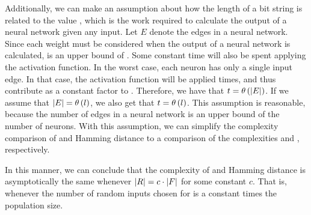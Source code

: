 Additionally, we can make an assumption about how the length of a bit string \bitstringl{} is related to the value \timet, which is the work required to calculate the output of a neural network given any input. Let $E$ denote the edges in a neural network. Since each weight must be considered when the output of a neural network is calculated,  is an upper bound of \timet. Some constant time will also be spent applying the activation function. In the worst case, each neuron has only a single input edge. In that case, the activation function will be applied  times, and thus contribute as a constant factor to \timet. Therefore, we have that $t = \theta\left(\lvert E\rvert\right)$. If we assume that $\lvert E\rvert = \theta\left(l\right)$, we also get that $t = \theta\left(l\right)$. This assumption is reasonable, because the number of edges in a neural network is an upper bound of the number of neurons. With this assumption, we can simplify the complexity comparison of \dia{} and Hamming distance to a comparison of the complexities \bigO{\ransetl} and \bigO{\indsetl}, respectively.

In this manner, we can conclude that the complexity of \dia{} and Hamming distance is asymptotically the same whenever $\lvert R\rvert = c \cdot \lvert F\rvert$ for some constant $c$. That is, whenever the number of random inputs chosen for \dia{} is a constant times the population size.
